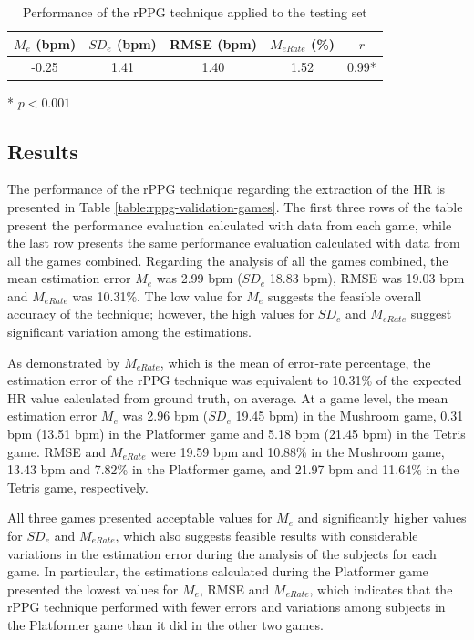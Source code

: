 \begin{table}
\caption{Performance of the rPPG technique applied to the testing set}
\label{table:rppg-validation}
\centering
\begin{threeparttable}
  \begin{tabular}{ccccc}
  \toprule
    $M_e$ (bpm) & $SD_e$ (bpm) & RMSE (bpm) & $M_{eRate}$ (\%) & $r$ \\
  \midrule
    -0.25 & 1.41 & 1.40 & 1.52 & 0.99* \\
  \bottomrule
  \end{tabular}
  \begin{tablenotes}
    \small
    \item[*]{$p < 0.001$}
  \end{tablenotes}
\end{threeparttable}
\end{table}

\subsection{Results}

The performance of the rPPG technique regarding the extraction of the HR is presented in Table \ref{table:rppg-validation-games}. The first three rows of the table present the performance evaluation calculated with data from each game, while the last row presents the same performance evaluation calculated with data from all the games combined. Regarding the analysis of all the games combined, the mean estimation error $M_e$ was 2.99 bpm ($SD_e$ 18.83 bpm), RMSE was 19.03 bpm and $M_{eRate}$ was 10.31\%. The low value for $M_e$ suggests the feasible overall accuracy of the technique; however, the high values for $SD_e$ and $M_{eRate}$ suggest significant variation among the estimations.

As demonstrated by $M_{eRate}$, which is the mean of error-rate percentage, the estimation error of the rPPG technique was equivalent to 10.31\% of the expected HR value calculated from ground truth, on average. At a game level, the mean estimation error $M_e$ was 2.96 bpm ($SD_e$ 19.45 bpm) in the Mushroom game, 0.31 bpm (13.51 bpm) in the Platformer game and 5.18 bpm (21.45 bpm) in the Tetris game. RMSE and $M_{eRate}$ were 19.59 bpm and 10.88\% in the Mushroom game, 13.43 bpm and 7.82\% in the Platformer game, and 21.97 bpm and 11.64\% in the Tetris game, respectively.

All three games presented acceptable values for $M_e$ and significantly higher values for $SD_e$ and $M_{eRate}$, which also suggests feasible results with considerable variations in the estimation error during the analysis of the subjects for each game. In particular, the estimations calculated during the Platformer game presented the lowest values for $M_e$, RMSE and $M_{eRate}$, which indicates that the rPPG technique performed with fewer errors and variations among subjects in the Platformer game than it did in the other two games.

